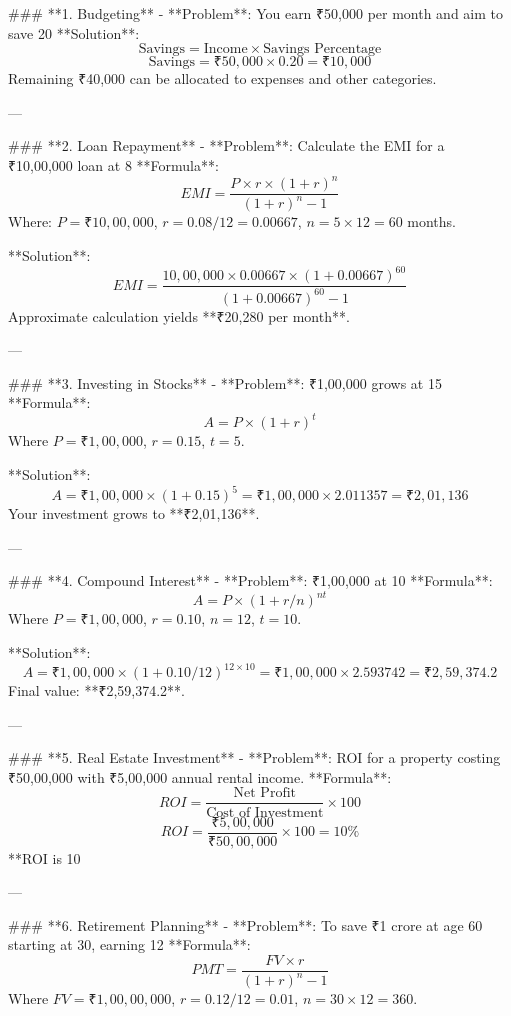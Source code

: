
### **1. Budgeting**
- **Problem**: You earn ₹50,000 per month and aim to save 20%
  **Solution**:  
  \[
  \text{Savings} = \text{Income} \times \text{Savings Percentage}
  \]  
  \[
  \text{Savings} = ₹50,000 \times 0.20 = ₹10,000
  \]  
  Remaining ₹40,000 can be allocated to expenses and other categories.

---

### **2. Loan Repayment**  
- **Problem**: Calculate the EMI for a ₹10,00,000 loan at 8%
  **Formula**:  
  \[
  EMI = \frac{P \times r \times (1 + r)^n}{(1 + r)^n - 1}
  \]  
  Where:  
  \(P = ₹10,00,000\), \(r = 0.08 / 12 = 0.00667\), \(n = 5 \times 12 = 60\) months.  

  **Solution**:  
  \[
  EMI = \frac{10,00,000 \times 0.00667 \times (1 + 0.00667)^{60}}{(1 + 0.00667)^{60} - 1}
  \]  
  Approximate calculation yields **₹20,280 per month**.

---

### **3. Investing in Stocks**  
- **Problem**: ₹1,00,000 grows at 15%
  **Formula**:  
  \[
  A = P \times (1 + r)^t
  \]  
  Where \(P = ₹1,00,000\), \(r = 0.15\), \(t = 5\).  

  **Solution**:  
  \[
  A = ₹1,00,000 \times (1 + 0.15)^5 = ₹1,00,000 \times 2.011357 = ₹2,01,136
  \]  
  Your investment grows to **₹2,01,136**.

---

### **4. Compound Interest**  
- **Problem**: ₹1,00,000 at 10%
  **Formula**:  
  \[
  A = P \times (1 + r/n)^{nt}
  \]  
  Where \(P = ₹1,00,000\), \(r = 0.10\), \(n = 12\), \(t = 10\).  

  **Solution**:  
  \[
  A = ₹1,00,000 \times (1 + 0.10/12)^{12 \times 10} = ₹1,00,000 \times 2.593742 = ₹2,59,374.2
  \]  
  Final value: **₹2,59,374.2**.

---

### **5. Real Estate Investment**  
- **Problem**: ROI for a property costing ₹50,00,000 with ₹5,00,000 annual rental income.  
  **Formula**:  
  \[
  ROI = \frac{\text{Net Profit}}{\text{Cost of Investment}} \times 100
  \]  
  \[
  ROI = \frac{₹5,00,000}{₹50,00,000} \times 100 = 10\%
  \]  
  **ROI is 10%

---

### **6. Retirement Planning**  
- **Problem**: To save ₹1 crore at age 60 starting at 30, earning 12%
  **Formula**:  
  \[
  PMT = \frac{FV \times r}{(1 + r)^n - 1}
  \]  
  Where \(FV = ₹1,00,00,000\), \(r = 0.12 / 12 = 0.01\), \(n = 30 \times 12 = 360\).  

